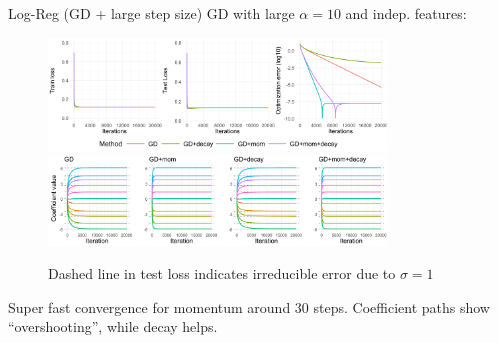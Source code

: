 \documentclass[11pt,compress,t,notes=noshow, xcolor=table]{beamer}
\begin{document}
\begin{vbframe}{Log-Reg (GD + large step size)}
\vspace{-0.5cm}
GD with large $\alpha=10$ and indep. features:
\begin{figure}
            \includegraphics[width=0.8\textwidth]{slides/04-multivariate-first-order/figure_man/simu_linmod/GD_log_large_lr_iters.pdf} \\
             \includegraphics[width=0.8\textwidth]{slides/04-multivariate-first-order/figure_man/simu_linmod/GD_log_coef_large.pdf}\\
            \begin{footnotesize}
                Dashed line in test loss indicates irreducible error due to $\sigma=1$
            \end{footnotesize}
\end{figure}
Super fast convergence for momentum around $30$ steps. Coefficient paths show ``overshooting'', while decay helps.
\end{vbframe}



\end{document}
